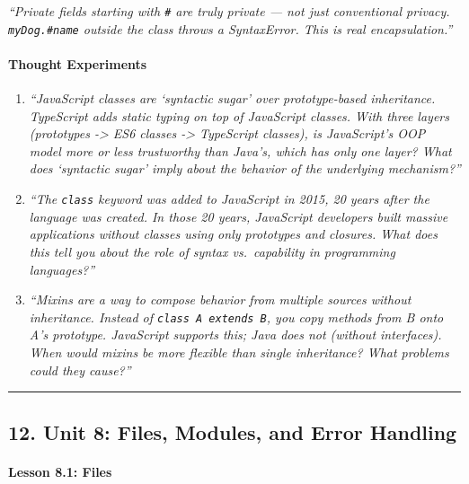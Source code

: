 \documentclass[
  justified,
  openright,
]{tufte-book}
\let\subsubsection\paragraph
\let\paragraph\paragraph
\let\subsubsection\paragraph
\let\paragraph\paragraph
\begin{document}
\emph{``Private fields starting with \texttt{\#} are truly private ---
not just conventional privacy. \texttt{myDog.\#name} outside the class
throws a SyntaxError. This is real encapsulation.''}

\paragraph{Thought Experiments}\label{thought-experiments-8}

\begin{enumerate}
\def\labelenumi{\arabic{enumi}.}
\item
  \emph{``JavaScript classes are `syntactic sugar' over prototype-based
  inheritance. TypeScript adds static typing on top of JavaScript
  classes. With three layers (prototypes -\textgreater{} ES6 classes
  -\textgreater{} TypeScript classes), is JavaScript's OOP model more or
  less trustworthy than Java's, which has only one layer? What does
  `syntactic sugar' imply about the behavior of the underlying
  mechanism?''}
\item
  \emph{``The \texttt{class} keyword was added to JavaScript in 2015, 20
  years after the language was created. In those 20 years, JavaScript
  developers built massive applications without classes using only
  prototypes and closures. What does this tell you about the role of
  syntax vs.~capability in programming languages?''}
\item
  \emph{``Mixins are a way to compose behavior from multiple sources
  without inheritance. Instead of \texttt{class\ A\ extends\ B}, you
  copy methods from B onto A's prototype. JavaScript supports this; Java
  does not (without interfaces). When would mixins be more flexible than
  single inheritance? What problems could they cause?''}
\end{enumerate}

\begin{center}\rule{0.5\linewidth}{0.5pt}\end{center}

\subsection{12. Unit 8: Files, Modules, and Error
Handling}\label{unit-8-files-modules-and-error-handling}

\subsubsection{Lesson 8.1: Files}\label{lesson-8.1-files}
\end{document}
